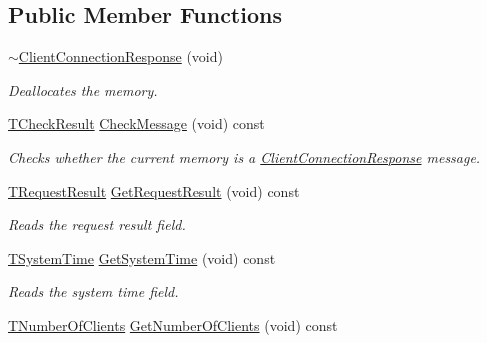 \subsection*{Public Member Functions}
\begin{DoxyCompactItemize}
\item 
\hyperlink{class_terra_swarm_1_1_asynchronous_1_1_client_connection_response_ad453032bf556306c0b603340a9e88e51}{$\sim$\-Client\-Connection\-Response} (void)
\begin{DoxyCompactList}\small\item\em Deallocates the memory. \end{DoxyCompactList}\item 
\hyperlink{class_terra_swarm_1_1_asynchronous_1_1_client_connection_response_aee00184a039b2aebfcefd9d5b5b71c89}{T\-Check\-Result} \hyperlink{class_terra_swarm_1_1_asynchronous_1_1_client_connection_response_a26dc6c7aa5b7114902a8ea0853d216aa}{Check\-Message} (void) const 
\begin{DoxyCompactList}\small\item\em Checks whether the current memory is a \hyperlink{class_terra_swarm_1_1_asynchronous_1_1_client_connection_response}{Client\-Connection\-Response} message. \end{DoxyCompactList}\item 
\hyperlink{class_terra_swarm_1_1_asynchronous_1_1_client_connection_response_a55a4d4527b877bde0e74da223157a62a}{T\-Request\-Result} \hyperlink{class_terra_swarm_1_1_asynchronous_1_1_client_connection_response_a84212711aa29decd7cae02a58b2c2fa9}{Get\-Request\-Result} (void) const 
\begin{DoxyCompactList}\small\item\em Reads the request result field. \end{DoxyCompactList}\item 
\hyperlink{class_terra_swarm_1_1_asynchronous_1_1_client_connection_response_ac32ae5e652874b024aae5ed2f816c155}{T\-System\-Time} \hyperlink{class_terra_swarm_1_1_asynchronous_1_1_client_connection_response_a2126f791ce018128bbf551dd78969a14}{Get\-System\-Time} (void) const 
\begin{DoxyCompactList}\small\item\em Reads the system time field. \end{DoxyCompactList}\item 
\hyperlink{class_terra_swarm_1_1_asynchronous_1_1_client_connection_response_a0780de58d62395a3cce207fe96e43ccc}{T\-Number\-Of\-Clients} \hyperlink{class_terra_swarm_1_1_asynchronous_1_1_client_connection_response_ad261b24429adf40a254d3ede6894d06c}{Get\-Number\-Of\-Clients} (void) const 

\end{DoxyCompactItemize}
